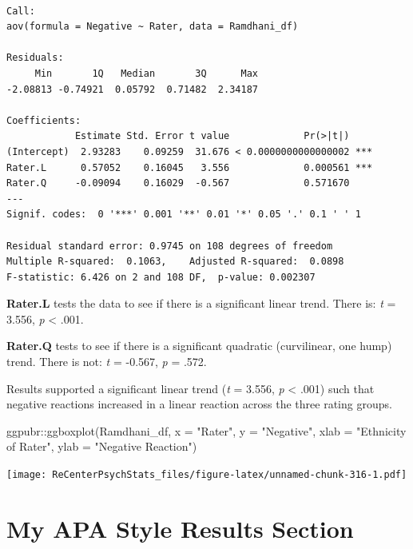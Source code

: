 \documentclass[
  11pt,
]{book}
\newenvironment{Shaded}{\begin{snugshade}}{\end{snugshade}}
\newcommand{\AttributeTok}[1]{\textcolor[rgb]{0.77,0.63,0.00}{#1}}
\newcommand{\FunctionTok}[1]{\textcolor[rgb]{0.00,0.00,0.00}{#1}}
\newcommand{\NormalTok}[1]{#1}
\newcommand{\SpecialCharTok}[1]{\textcolor[rgb]{0.00,0.00,0.00}{#1}}
\newcommand{\StringTok}[1]{\textcolor[rgb]{0.31,0.60,0.02}{#1}}
\begin{document}
\begin{verbatim}

Call:
aov(formula = Negative ~ Rater, data = Ramdhani_df)

Residuals:
     Min       1Q   Median       3Q      Max 
-2.08813 -0.74921  0.05792  0.71482  2.34187 

Coefficients:
            Estimate Std. Error t value             Pr(>|t|)    
(Intercept)  2.93283    0.09259  31.676 < 0.0000000000000002 ***
Rater.L      0.57052    0.16045   3.556             0.000561 ***
Rater.Q     -0.09094    0.16029  -0.567             0.571670    
---
Signif. codes:  0 '***' 0.001 '**' 0.01 '*' 0.05 '.' 0.1 ' ' 1

Residual standard error: 0.9745 on 108 degrees of freedom
Multiple R-squared:  0.1063,    Adjusted R-squared:  0.0898 
F-statistic: 6.426 on 2 and 108 DF,  p-value: 0.002307
\end{verbatim}

\textbf{Rater.L} tests the data to see if there is a significant linear trend. There is: \emph{t} = 3.556, \emph{p} \textless{} .001.

\textbf{Rater.Q} tests to see if there is a significant quadratic (curvilinear, one hump) trend. There is not: \emph{t} = -0.567, \emph{p} = .572.

Results supported a significant linear trend (\emph{t} = 3.556, \emph{p} \textless{} .001) such that negative reactions increased in a linear reaction across the three rating groups.

\begin{Shaded}
\begin{Highlighting}[]
\NormalTok{ggpubr}\SpecialCharTok{::}\FunctionTok{ggboxplot}\NormalTok{(Ramdhani\_df, }\AttributeTok{x =} \StringTok{"Rater"}\NormalTok{, }\AttributeTok{y =} \StringTok{"Negative"}\NormalTok{, }\AttributeTok{xlab =} \StringTok{"Ethnicity of Rater"}\NormalTok{,}
    \AttributeTok{ylab =} \StringTok{"Negative Reaction"}\NormalTok{)}
\end{Highlighting}
\end{Shaded}

\texttt{[image: ReCenterPsychStats\_files/figure-latex/unnamed-chunk-316-1.pdf]}

\hypertarget{my-apa-style-results-section}{%
\section{My APA Style Results Section}\label{my-apa-style-results-section}}
\end{document}

